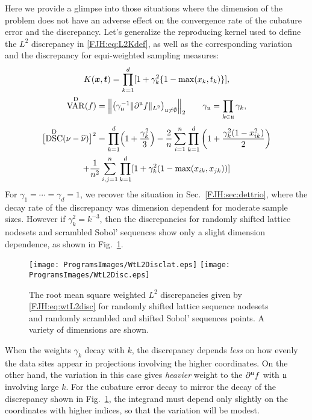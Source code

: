\documentclass[graybox,footinfo]{svmult}
\DeclareMathOperator{\disc}{DSC}
\DeclareMathOperator{\Var}{VAR}
\begin{document}
Here we provide a glimpse into those situations where the dimension of the problem does 
not have an adverse effect on the convergence rate of the cubature error and the 
discrepancy.  Let's generalize the reproducing kernel used to define the 
$L^2$ discrepancy in \eqref{FJH:eq:L2Kdef}, as well as the corresponding 
variation and the discrepancy for equi-weighted sampling measures:
\begin{gather*} \label{FJH:eq:wtL2Kdef}
K(\bsx,\bst) =\prod_{k = 1}^d [1 + \gamma_k^2\{1 - \max(x_k,t_k)\}], \\
\Var^\Dt(f) = \Bigl \lVert \bigl (\gamma_{\fraku}^{-1}
\lVert\partial^{\fraku} f\rVert_{L^2}\bigr )_{\fraku \ne \emptyset} \Bigr \rVert_2 \qquad
\gamma_{\fraku} = \prod_{k \in \fraku} \gamma_k,
\end{gather*}
\begin{multline} \label{FJH:eq:wtL2disc}
\bigl[\disc^\Dt(\nu - \hnu)\bigr]^2 = \prod_{k=1}^d\Bigl(1 + \frac{\gamma_k^2}{3}\Bigr)
- \frac{2}{n} \sum_{i=1}^n \prod_{k=1}^d \left (1 + \frac{\gamma_k^2(1 - 
x_{ik}^2)}{2} \right) \\ + \frac{1}{n^2}\sum_{i,j=1}^n \prod_{k = 1}^d [1 + 
\gamma_k^2( 1 - \max(x_{ik},x_{jk}))]
\end{multline}
For $\gamma_1 = \cdots = \gamma_d = 1$, we recover the situation in Sec.\ 
\ref{FJH:sec:dettrio}, where the decay rate of the discrepancy was dimension dependent 
for moderate sample sizes.  However if $\gamma_k^2 = 
k^{-3}$, then the discrepancies for randomly shifted lattice nodesets and scrambled   
Sobol' sequences show only a slight dimension dependence, as shown in Fig.\ 
\ref{FJH:fig:wtdiscdiffpts}.

\begin{figure}
	\centering
	\texttt{[image: ProgramsImages/WtL2Disclat.eps]}   \qquad 
	\texttt{[image: ProgramsImages/WtL2Disc.eps]} 
	\caption{The root mean square weighted $L^2$ discrepancies given by 
	\eqref{FJH:eq:wtL2disc} 
		for randomly shifted 
		lattice sequence nodesets and randomly scrambled and shifted Sobol' sequences 
		points.  A variety of dimensions are shown.
		\label{FJH:fig:wtdiscdiffpts}}
\end{figure}

When the weights $\gamma_k$ decay with $k$, the discrepancy depends \emph{less} 
on how evenly the data sites appear in projections involving the higher coordinates.  On 
the other hand, the variation in this case gives 
\emph{heavier} weight to the $\partial^{{\mathfrak{u}}} f$ with 
${\mathfrak{u}}$ involving large $k$.  For the cubature error decay to mirror the decay of the 
discrepancy shown in Fig.\ \ref{FJH:fig:wtdiscdiffpts}, the integrand must depend only 
slightly on the coordinates with higher indices, so that the variation will be modest.
\end{document}
